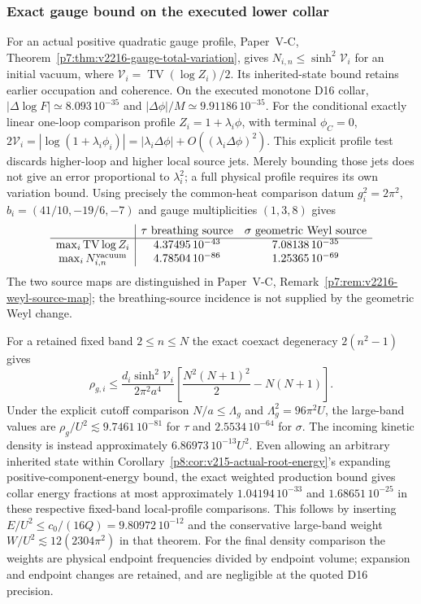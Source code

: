 \documentclass[12pt,a4paper]{article}
\begin{document}
\subsubsection{Exact gauge bound on the executed lower collar}
\label{p8:sec:v2216-gauge-collar}
For an actual positive quadratic gauge profile, Paper~V-C,
Theorem~\ref{p7:thm:v2216-gauge-total-variation}, gives
$N_{i,n}\le\sinh^2\mathcal V_i$ for an initial vacuum, where
$\mathcal V_i=\operatorname{TV}(\log Z_i)/2$.
Its inherited-state bound retains earlier occupation and coherence.
On the executed monotone D16 collar,
$|\Delta\log F|\simeq8.093\,10^{-35}$ and
$|\Delta\phi|/M\simeq9.91186\,10^{-35}$.
For the conditional exactly linear one-loop comparison profile
$Z_i=1+\lambda_i\phi$, with terminal $\phi_C=0$,
$2\mathcal V_i=|\log(1+\lambda_i\phi_i)|
=|\lambda_i\Delta\phi|+O((\lambda_i\Delta\phi)^2)$.
This explicit profile test discards higher-loop and higher local source
jets.  Merely bounding those jets does not give an error proportional to
$\lambda_i^2$; a full physical profile requires its own variation bound.
Using precisely the common-heat comparison datum $g_i^2=2\pi^2$,
$b_i=(41/10,-19/6,-7)$ and gauge multiplicities $(1,3,8)$ gives
\[
\begin{array}{c|cc}
 &\tau\text{ breathing source}&\sigma\text{ geometric Weyl source}\\\hline
 \max_i\operatorname{TV}\log Z_i
      &4.37495\,10^{-43}&7.08138\,10^{-35}\\
 \max_iN_{i,n}^{\rm vacuum}
      &4.78504\,10^{-86}&1.25365\,10^{-69}
\end{array}
\]
The two source maps are distinguished in Paper~V-C,
Remark~\ref{p7:rem:v2216-weyl-source-map}; the breathing-source
incidence is not supplied by the geometric Weyl change.

For a retained fixed band $2\le n\le N$ the exact coexact degeneracy
$2(n^2-1)$ gives
\[
 \rho_{g,i}\le\frac{d_i\sinh^2\mathcal V_i}{2\pi^2a^4}
 \left[\frac{N^2(N+1)^2}{2}-N(N+1)\right].
\]
Under the explicit cutoff comparison $N/a\le\Lambda_g$ and
$\Lambda_g^2=96\pi^2U$, the large-band values are
$\rho_g/U^2\lesssim9.7461\,10^{-81}$ for $\tau$ and
$2.5534\,10^{-64}$ for $\sigma$.
The incoming kinetic density is instead approximately
$6.86973\,10^{-13}U^2$.  Even allowing an arbitrary inherited state
within Corollary~\ref{p8:cor:v215-actual-root-energy}'s expanding
positive-component-energy bound, the exact weighted production bound
gives collar energy fractions at most approximately
$1.04194\,10^{-33}$ and $1.68651\,10^{-25}$ in these respective
fixed-band local-profile comparisons.  This follows by inserting
$E/U^2\le c_0/(16Q)=9.80972\,10^{-12}$ and the conservative
large-band weight $W/U^2\lesssim12(2304\pi^2)$ in that theorem.
For the final density comparison the weights are physical endpoint
frequencies divided by endpoint volume; expansion and endpoint changes
are retained, and are negligible at the quoted D16 precision.
\end{document}

